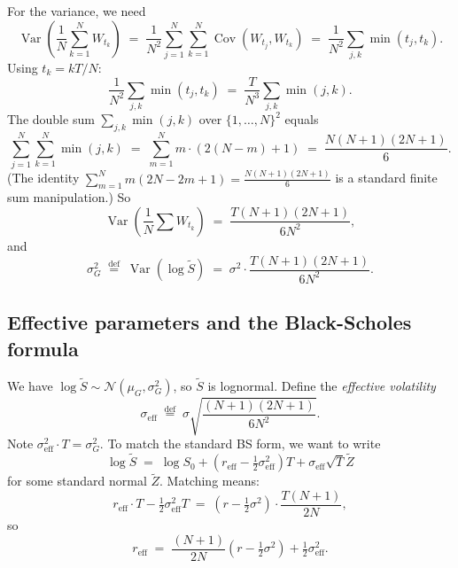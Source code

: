\documentclass[11pt,a4paper]{article}
\theoremstyle{plain}
\theoremstyle{definition}
\theoremstyle{remark}
\newcommand{\Var}{\operatorname{Var}}
\newcommand{\Cov}{\operatorname{Cov}}
\newcommand{\eqdef}{\overset{\mathrm{def}}{=}}
\begin{document}
For the variance, we need
\begin{equation}
\Var\!\left(\frac{1}{N}\sum_{k=1}^N W_{t_k}\right)
\;=\; \frac{1}{N^2} \sum_{j=1}^N \sum_{k=1}^N \Cov(W_{t_j}, W_{t_k})
\;=\; \frac{1}{N^2} \sum_{j,k} \min(t_j, t_k).
\end{equation}
Using $t_k = kT/N$:
\begin{equation}
\frac{1}{N^2}\sum_{j,k} \min(t_j, t_k)
\;=\; \frac{T}{N^3}\sum_{j,k}\min(j, k).
\end{equation}
The double sum $\sum_{j,k}\min(j,k)$ over $\{1, \ldots, N\}^2$ equals
\begin{equation}
\sum_{j=1}^N\sum_{k=1}^N \min(j,k)
\;=\; \sum_{m=1}^N m \cdot (2(N-m) + 1)
\;=\; \frac{N(N+1)(2N+1)}{6}.
\end{equation}
(The identity $\sum_{m=1}^N m(2N - 2m + 1) = \frac{N(N+1)(2N+1)}{6}$
is a standard finite sum manipulation.)
So
\begin{equation}
\Var\!\left(\frac{1}{N}\sum W_{t_k}\right)
\;=\; \frac{T(N+1)(2N+1)}{6N^2},
\end{equation}
and
\begin{equation}
\sigma_G^2 \;\eqdef\; \Var(\log \tilde S)
\;=\; \sigma^2 \cdot \frac{T(N+1)(2N+1)}{6N^2}.
\end{equation}

\subsection{Effective parameters and the Black-Scholes formula}

We have $\log \tilde S \sim \mathcal{N}(\mu_G, \sigma_G^2)$, so
$\tilde S$ is lognormal. Define the \emph{effective volatility}
\begin{equation}
\sigma_{\mathrm{eff}}
\;\eqdef\; \sigma \sqrt{\frac{(N+1)(2N+1)}{6N^2}}.
\end{equation}
Note $\sigma_{\mathrm{eff}}^2 \cdot T = \sigma_G^2$. To match the
standard BS form, we want to write
\begin{equation}
\log \tilde S \;=\; \log S_0 + (r_{\mathrm{eff}} - \tfrac{1}{2}\sigma_{\mathrm{eff}}^2)T + \sigma_{\mathrm{eff}}\sqrt T \tilde Z
\end{equation}
for some standard normal $\tilde Z$. Matching means:
\begin{equation}
r_{\mathrm{eff}} \cdot T - \tfrac{1}{2}\sigma_{\mathrm{eff}}^2 T
\;=\; (r - \tfrac{1}{2}\sigma^2) \cdot \frac{T(N+1)}{2N},
\end{equation}
so
\begin{equation}
r_{\mathrm{eff}} \;=\; \frac{(N+1)}{2N}(r - \tfrac{1}{2}\sigma^2)
+ \tfrac{1}{2}\sigma_{\mathrm{eff}}^2.
\end{equation}
\end{document}
